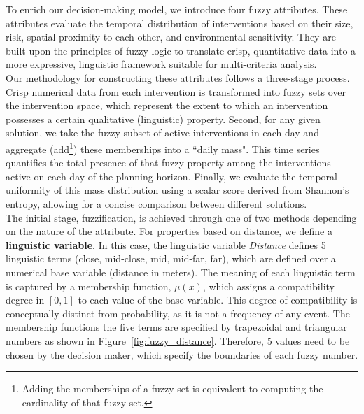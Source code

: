 To enrich our decision-making model, we introduce four fuzzy attributes. These attributes evaluate the temporal distribution of interventions based on their size, risk, spatial proximity to each other, and environmental sensitivity. They are built upon the principles of fuzzy logic to translate crisp, quantitative data into a more expressive, linguistic framework suitable for multi-criteria analysis.\\

Our methodology for constructing these attributes follows a three-stage process. Crisp numerical data from each intervention is transformed into fuzzy sets over the intervention space, which represent the extent to which an intervention possesses a certain qualitative (linguistic) property. Second, for any given solution, 
we take the fuzzy subset of active interventions in each day and aggregate (add\footnote{Adding the memberships of a fuzzy set is equivalent to computing the cardinality of that fuzzy set.}) these memberships into a ``daily mass". This time series quantifies the total presence of that fuzzy property among the interventions active on each day of the planning horizon. Finally, we evaluate the temporal uniformity of this mass distribution using a scalar score derived from Shannon's entropy, allowing for a concise comparison between different solutions.\\

The initial stage, fuzzification, is achieved through one of two methods depending on the nature of the attribute. For properties based on distance, we define a \textbf{linguistic variable}. In this case, the linguistic variable \textit{Distance} defines 5 linguistic terms (close, mid-close, mid, mid-far, far), which are defined over a numerical base variable (distance in meters). The meaning of each linguistic term is captured by a membership function, $\mu(x)$, which assigns a compatibility degree in $[0, 1]$ to each value of the base variable. This degree of compatibility is conceptually distinct from probability, as it is not a frequency of any event. The membership functions the five terms are specified by trapezoidal and triangular numbers as shown in Figure~\ref{fig:fuzzy_distance}. Therefore, 5 values need to be chosen by the decision maker, which specify the boundaries of each fuzzy number.\\


